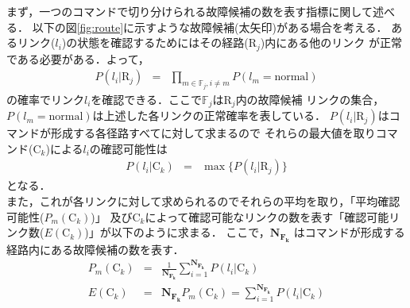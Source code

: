 \documentclass[11pt]{jsarticle}%
\begin{document}
\begin{multicols}{2}
 まず，一つのコマンドで切り分けられる故障候補の数を表す指標に関して述べる．
 以下の図\ref{fig:route}に示すような故障候補(太矢印)がある場合を考える．
 あるリンク($l_i$)の状態を確認するためにはその経路($\text{R}_j$)内にある他のリンク
 が正常である必要がある．よって，
 \begin{eqnarray}
  P(l_{i} | \text{R}_j) &=& \prod_{m\in\mathbb{F}_j,i\neq m} P(l_{m} = \text{normal})
 \end{eqnarray}
 の確率でリンク$l_i$を確認できる．ここで$\mathbb{F}_j$は$\text{R}_j$内の故障候補
 リンクの集合，$P(l_{m} = \text{normal})$は上述した各リンクの正常確率を表している．
 $P(l_{i} | \text{R}_j)$はコマンドが形成する各径路すべてに対して求まるので
 それらの最大値を取りコマンド(C$_k$)による$l_i$の確認可能性は
\begin{eqnarray}
  P(l_i|\text{C}_k) &=& \max  \{ P(l_i|\text{R}_{j})\}
\end{eqnarray}
となる．\\
また，これが各リンクに対して求められるのでそれらの平均を取り，「平均確認可能性($P_m(\text{C}_k)$)」
及びC$_k$によって確認可能なリンクの数を表す「確認可能リンク数($E(\text{C}_k)$)」が以下のように求まる．
ここで，$\mathbf{N_{F_k}}$
はコマンドが形成する経路内にある故障候補の数を表す．
\begin{eqnarray}
  P_m(\text{C}_k) &=& \frac{1}{\mathbf{N_{F_k}}}\sum_{i=1}^{\mathbf{N_{F_k}}}
  P(l_i|\text{C}_k) \label{eq:Pm Ck} \\
  E(\text{C}_k) &=& \mathbf{N_{F_k}}P_m(\text{C}_k) =
   \sum_{i=1}^{\mathbf{N_{F_k}}}P(l_i|\text{C}_k) \label{eq:E Ck}
\end{eqnarray}


\end{multicols}
\end{document}
